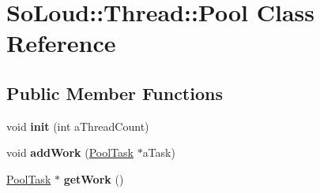 \hypertarget{class_so_loud_1_1_thread_1_1_pool}{}\section{So\+Loud\+:\+:Thread\+:\+:Pool Class Reference}
\label{class_so_loud_1_1_thread_1_1_pool}
\subsection*{Public Member Functions}
\begin{DoxyCompactItemize}
\item 
\mbox{\label{class_so_loud_1_1_thread_1_1_pool_a941c254d36737e2ba09b9076e9bbe0c6}} 
void {\bfseries init} (int a\+Thread\+Count)
\item 
\mbox{\label{class_so_loud_1_1_thread_1_1_pool_af5a6382384729d775638067e27704b1b}} 
void {\bfseries add\+Work} (\mbox{\hyperlink{class_so_loud_1_1_thread_1_1_pool_task}{Pool\+Task}} $\ast$a\+Task)
\item 
\mbox{\label{class_so_loud_1_1_thread_1_1_pool_aadab9a627368894d3953df905193b81f}} 
\mbox{\hyperlink{class_so_loud_1_1_thread_1_1_pool_task}{Pool\+Task}} $\ast$ {\bfseries get\+Work} ()
\end{DoxyCompactItemize}
